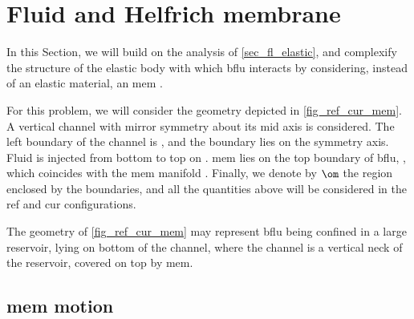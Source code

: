 \section{Fluid and Helfrich membrane}\label{sec_fl_mem}

In this Section, we will build on the analysis of \cref{sec_fl_elastic}, and complexify the structure of the elastic body with which \ac{bflu} interacts by considering, instead of an elastic material, an \ac{mem} \cite{helfrichElasticPropertiesLipid1973,derenyiFormationInteractionMembrane2002}.

For this problem, we will consider the  geometry depicted in \cref{fig_ref_cur_mem}. A vertical channel with mirror symmetry about its mid axis is considered. The left boundary of the channel is \pomin{}, and the boundary \pomout{} lies on the symmetry axis. Fluid is injected from bottom to top on \pombottom. \ac{mem} lies on the top boundary of \ac{bflu}, \pomtop{}, which  coincides with the \ac{mem} manifold \pomline{}. Finally, we denote by $\om$ the region enclosed by the boundaries, and all the quantities above will be considered in the \ac{ref} and \ac{cur} configurations.

The geometry of \cref{fig_ref_cur_mem} may represent \ac{bflu} being confined in a large reservoir, lying on bottom of the channel, where the channel is a vertical neck of the reservoir, covered on top by \ac{mem}.

\subsection{\Acl{mem} motion}
\label{sec_fl_mem_mem}

